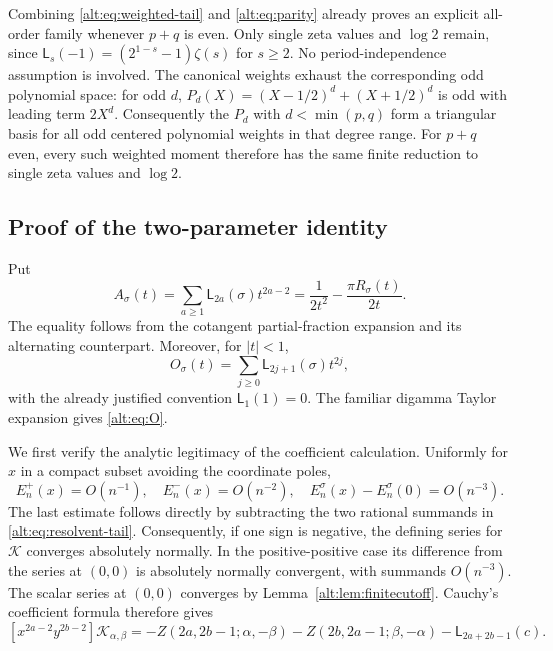 Combining \eqref{alt:eq:weighted-tail} and \eqref{alt:eq:parity}
already proves an explicit all-order family whenever $p+q$ is even.
Only single zeta values and $\log2$ remain, since
$\mathsf L_s(-1)=(2^{1-s}-1)\zeta(s)$ for $s\ge2$.
No period-independence assumption is involved.
The canonical weights exhaust the corresponding odd polynomial space:
for odd $d$,
$P_d(X)=(X-1/2)^d+(X+1/2)^d$ is odd with leading term $2X^d$.
Consequently the $P_d$ with $d<\min(p,q)$ form a triangular basis
for all odd centered polynomial weights in that degree range.
For $p+q$ even, every such weighted moment therefore has the same
finite reduction to single zeta values and $\log2$.

\subsection{Proof of the two-parameter identity}

Put
\[
 A_\sigma(t)=\sum_{a\ge1}\mathsf L_{2a}(\sigma)t^{2a-2}
       =\frac1{2t^2}-\frac{\pi R_\sigma(t)}{2t}.
\]
The equality follows from the cotangent partial-fraction expansion and
its alternating counterpart. Moreover, for $|t|<1$,
\[
 O_\sigma(t)=\sum_{j\ge0}\mathsf L_{2j+1}(\sigma)t^{2j},
\]
with the already justified convention $\mathsf L_1(1)=0$.
The familiar digamma Taylor expansion gives \eqref{alt:eq:O}.

We first verify the analytic legitimacy of the coefficient calculation.
Uniformly for $x$ in a compact subset avoiding the coordinate poles,
\[
 E_n^+(x)=O(n^{-1}),\quad E_n^-(x)=O(n^{-2}),\quad
 E_n^\sigma(x)-E_n^\sigma(0)=O(n^{-3}).
\]
The last estimate follows directly by subtracting the two rational
summands in \eqref{alt:eq:resolvent-tail}. Consequently, if one sign is
negative, the defining series for $\mathcal K$ converges absolutely
normally. In the positive-positive case its difference from the series
at $(0,0)$ is absolutely normally convergent, with summands $O(n^{-3})$.
The scalar series at $(0,0)$ converges by Lemma~\ref{alt:lem:finitecutoff}.
Cauchy's coefficient formula therefore gives
\begin{equation}\label{alt:eq:master-coeff}
 [x^{2a-2}y^{2b-2}]\mathcal K_{\alpha,\beta}
 =-Z(2a,2b-1;\alpha,-\beta)
  -Z(2b,2a-1;\beta,-\alpha)
  -\mathsf L_{2a+2b-1}(c).
\end{equation}

